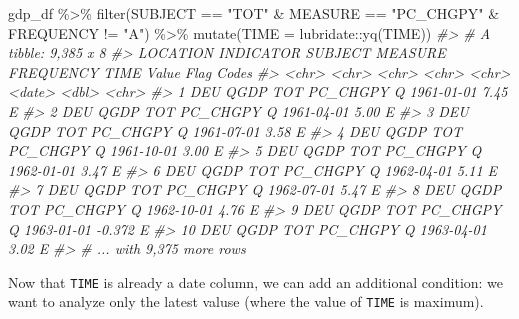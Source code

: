 \documentclass[
]{article}
\newenvironment{Shaded}{\begin{snugshade}}{\end{snugshade}}
\newcommand{\AttributeTok}[1]{\textcolor[rgb]{0.77,0.63,0.00}{#1}}
\newcommand{\CommentTok}[1]{\textcolor[rgb]{0.56,0.35,0.01}{\textit{#1}}}
\newcommand{\FunctionTok}[1]{\textcolor[rgb]{0.00,0.00,0.00}{#1}}
\newcommand{\NormalTok}[1]{#1}
\newcommand{\SpecialCharTok}[1]{\textcolor[rgb]{0.00,0.00,0.00}{#1}}
\newcommand{\StringTok}[1]{\textcolor[rgb]{0.31,0.60,0.02}{#1}}
\begin{document}
\begin{Shaded}
\begin{Highlighting}[]
\NormalTok{gdp\_df }\SpecialCharTok{\%\textgreater{}\%} 
  \FunctionTok{filter}\NormalTok{(SUBJECT }\SpecialCharTok{==} \StringTok{"TOT"} \SpecialCharTok{\&}\NormalTok{ MEASURE }\SpecialCharTok{==} \StringTok{"PC\_CHGPY"} \SpecialCharTok{\&}\NormalTok{ FREQUENCY }\SpecialCharTok{!=} \StringTok{"A"}\NormalTok{) }\SpecialCharTok{\%\textgreater{}\%} 
  \FunctionTok{mutate}\NormalTok{(}\AttributeTok{TIME =}\NormalTok{ lubridate}\SpecialCharTok{::}\FunctionTok{yq}\NormalTok{(TIME))}
\CommentTok{\#\textgreater{} \# A tibble: 9,385 x 8}
\CommentTok{\#\textgreater{}    LOCATION INDICATOR SUBJECT MEASURE  FREQUENCY TIME        Value \textasciigrave{}Flag Codes\textasciigrave{}}
\CommentTok{\#\textgreater{}    \textless{}chr\textgreater{}    \textless{}chr\textgreater{}     \textless{}chr\textgreater{}   \textless{}chr\textgreater{}    \textless{}chr\textgreater{}     \textless{}date\textgreater{}      \textless{}dbl\textgreater{} \textless{}chr\textgreater{}       }
\CommentTok{\#\textgreater{}  1 DEU      QGDP      TOT     PC\_CHGPY Q         1961{-}01{-}01  7.45  E           }
\CommentTok{\#\textgreater{}  2 DEU      QGDP      TOT     PC\_CHGPY Q         1961{-}04{-}01  5.00  E           }
\CommentTok{\#\textgreater{}  3 DEU      QGDP      TOT     PC\_CHGPY Q         1961{-}07{-}01  3.58  E           }
\CommentTok{\#\textgreater{}  4 DEU      QGDP      TOT     PC\_CHGPY Q         1961{-}10{-}01  3.00  E           }
\CommentTok{\#\textgreater{}  5 DEU      QGDP      TOT     PC\_CHGPY Q         1962{-}01{-}01  3.47  E           }
\CommentTok{\#\textgreater{}  6 DEU      QGDP      TOT     PC\_CHGPY Q         1962{-}04{-}01  5.11  E           }
\CommentTok{\#\textgreater{}  7 DEU      QGDP      TOT     PC\_CHGPY Q         1962{-}07{-}01  5.47  E           }
\CommentTok{\#\textgreater{}  8 DEU      QGDP      TOT     PC\_CHGPY Q         1962{-}10{-}01  4.76  E           }
\CommentTok{\#\textgreater{}  9 DEU      QGDP      TOT     PC\_CHGPY Q         1963{-}01{-}01 {-}0.372 E           }
\CommentTok{\#\textgreater{} 10 DEU      QGDP      TOT     PC\_CHGPY Q         1963{-}04{-}01  3.02  E           }
\CommentTok{\#\textgreater{} \# ... with 9,375 more rows}
\end{Highlighting}
\end{Shaded}

Now that \texttt{TIME} is already a date column, we can add an additional condition: we want to analyze only the latest valuse (where the value of \texttt{TIME} is maximum).
\end{document}
